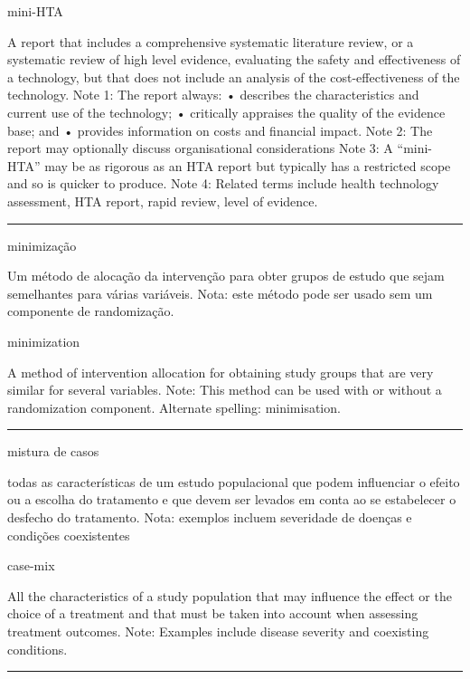 \documentclass[
  openany]{book}
\begin{document}
mini-HTA

A report that includes a comprehensive systematic literature review, or a systematic review of high level evidence, evaluating the safety and effectiveness of a technology, but that does not include an analysis of the cost-effectiveness of the technology. Note 1: The report always:
• describes the characteristics and current use of the technology;
• critically appraises the quality of the evidence base; and
• provides information on costs and financial impact. Note 2: The report may optionally discuss organisational considerations Note 3: A ``mini-HTA'' may be as rigorous as an HTA report but typically has a restricted scope and so is quicker to produce. Note 4: Related terms include health technology assessment, HTA report, rapid review, level of evidence.

\begin{center}\rule{0.5\linewidth}{0.5pt}\end{center}

minimização

Um método de alocação da intervenção para obter grupos de estudo que sejam semelhantes para várias variáveis. Nota: este método pode ser usado sem um componente de randomização.

minimization

A method of intervention allocation for obtaining study groups that are very similar for several variables. Note: This method can be used with or without a randomization component. Alternate spelling: minimisation.

\begin{center}\rule{0.5\linewidth}{0.5pt}\end{center}

mistura de casos

todas as características de um estudo populacional que podem influenciar o efeito ou a escolha do tratamento e que devem ser levados em conta ao se estabelecer o desfecho do tratamento. Nota: exemplos incluem severidade de doenças e condições coexistentes

case-mix

All the characteristics of a study population that may influence the effect or the choice of a treatment and that must be taken into account when assessing treatment outcomes. Note: Examples include disease severity and coexisting conditions.

\begin{center}\rule{0.5\linewidth}{0.5pt}\end{center}
\end{document}
